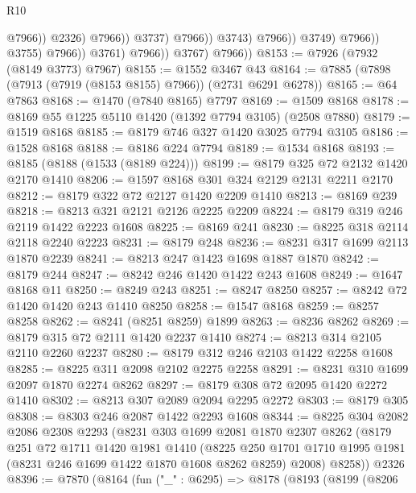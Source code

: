 \begin{lexlean}{R10}
\begin{coremodule}
                                                  @7966))
                                              @2326)
                                            @7966))
                                        @3737)
                                      @7966))
                                  @3743)
                                @7966))
                            @3749)
                          @7966))
                      @3755)
                    @7966))
                @3761)
              @7966))
          @3767)
        @7966))
@8153 := @7926 (@7932 (@8149 @3773) @7967)
@8155 := @1552 @3467 @43
@8164 := @7885 (@7898 (@7913 (@7919 (@8153 @8155) @7966)) (@2731 @6291 @6278))
@8165 := @64 @7863
@8168 := @1470 (@7840 @8165) @7797
@8169 := @1509 @8168
@8178 := @8169 @55 @1225 @5110 @1420 (@1392 @7794 @3105) (@2508 @7880)
@8179 := @1519 @8168
@8185 := @8179 @746 @327 @1420 @3025 @7794 @3105
@8186 := @1528 @8168
@8188 := @8186 @224 @7794
@8189 := @1534 @8168
@8193 := @8185 (@8188 (@1533 (@8189 @224)))
@8199 := @8179 @325 @72 @2132 @1420 @2170 @1410
@8206 := @1597 @8168 @301 @324 @2129 @2131 @2211 @2170
@8212 := @8179 @322 @72 @2127 @1420 @2209 @1410
@8213 := @8169 @239
@8218 := @8213 @321 @2121 @2126 @2225 @2209
@8224 := @8179 @319 @246 @2119 @1422 @2223 @1608
@8225 := @8169 @241
@8230 := @8225 @318 @2114 @2118 @2240 @2223
@8231 := @8179 @248
@8236 := @8231 @317 @1699 @2113 @1870 @2239
@8241 := @8213 @247 @1423 @1698 @1887 @1870
@8242 := @8179 @244
@8247 := @8242 @246 @1420 @1422 @243 @1608
@8249 := @1647 @8168 @11
@8250 := @8249 @243
@8251 := @8247 @8250
@8257 := @8242 @72 @1420 @1420 @243 @1410 @8250
@8258 := @1547 @8168
@8259 := @8257 @8258
@8262 := @8241 (@8251 @8259) @1899
@8263 := @8236 @8262
@8269 := @8179 @315 @72 @2111 @1420 @2237 @1410
@8274 := @8213 @314 @2105 @2110 @2260 @2237
@8280 := @8179 @312 @246 @2103 @1422 @2258 @1608
@8285 := @8225 @311 @2098 @2102 @2275 @2258
@8291 := @8231 @310 @1699 @2097 @1870 @2274 @8262
@8297 := @8179 @308 @72 @2095 @1420 @2272 @1410
@8302 := @8213 @307 @2089 @2094 @2295 @2272
@8303 := @8179 @305
@8308 := @8303 @246 @2087 @1422 @2293 @1608
@8344 := @8225
    @304
    @2082
    @2086
    @2308
    @2293
    (@8231
      @303
      @1699
      @2081
      @1870
      @2307
      @8262
      (@8179
        @251
        @72
        @1711
        @1420
        @1981
        @1410
        (@8225 @250 @1701 @1710 @1995 @1981 (@8231 @246 @1699 @1422 @1870 @1608 @8262 @8259) @2008)
        @8258))
    @2326
@8396 := @7870
    (@8164
      (fun ("_" : @6295) =>
      @8178
        (@8193
          (@8199
            (@8206

\end{coremodule}
\end{lexlean}
